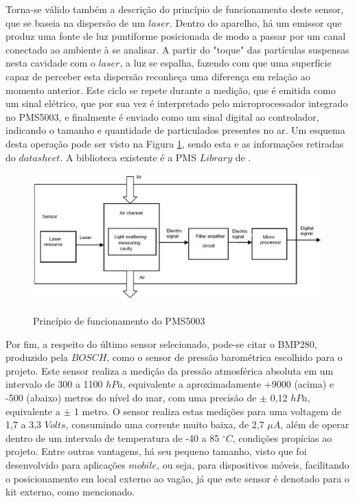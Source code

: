 \documentclass[acronym,symbols]{fei}
\begin{document}
Torna-se válido também a descrição do princípio de funcionamento deste sensor, que se baseia na dispersão de um $laser$. Dentro do aparelho, há um emissor que produz uma fonte de luz puntiforme posicionada de modo a passar por um canal conectado ao ambiente à se analisar. A partir do "toque" das partículas suspensas nesta cavidade com o $laser$, a luz se espalha, fazendo com que uma superfície capaz de perceber esta dispersão reconheça uma diferença em relação ao momento anterior. Este ciclo se repete durante a medição, que é emitida como um sinal elétrico, que por sua vez é interpretado pelo microprocessador integrado no PMS5003, e finalmente é enviado como um sinal digital ao controlador, indicando o tamanho e quantidade de particulados presentes no ar. Um esquema desta operação pode ser visto na Figura \ref{fig:FuncPart}, sendo esta e as informações retiradas do $datasheet$. A biblioteca existente é a PMS $Library$ de \textcite{ArduinoPMS}.

\begin{figure}[!htb]
\centering
    \caption{Princípio de funcionamento do PMS5003}
    \includegraphics[width=0.8\linewidth]{Imagens/FuncPart.png}
    \label{fig:FuncPart}
\end{figure}

Por fim, a respeito do último sensor selecionado, pode-se citar o BMP280, produzido pela $BOSCH$, como o sensor de pressão barométrica escolhido para o projeto. Este sensor realiza a medição da pressão atmosférica absoluta em um intervalo de 300 a 1100 $hPa$, equivalente a aproximadamente +9000 (acima) e -500 (abaixo) metros do nível do mar, com uma precisão de $\pm$ 0,12 $hPa$, equivalente a $\pm$ 1 metro. O sensor realiza estas medições para uma voltagem de 1,7 a 3,3 $Volts$, consumindo uma corrente muito baixa, de 2,7 $\mu$$A$, além de operar dentro de um intervalo de temperatura de -40 a 85 $^{\circ}C$, condições propícias ao projeto. Entre outras vantagens, há seu pequeno tamanho, visto que foi desenvolvido para aplicações $mobile$, ou seja, para dispositivos móveis, facilitando o posicionamento em local externo ao vagão, já que este sensor é denotado para o kit externo, como mencionado.
\end{document}
